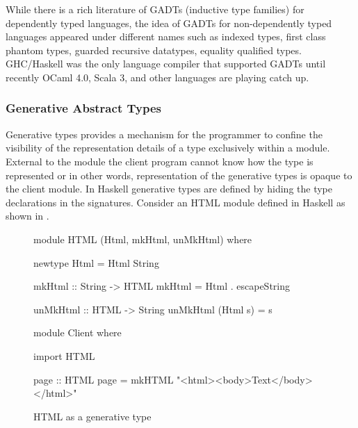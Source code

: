 \documentclass[manuscript,screen,nonacm]{acmart}
\begin{document}
While there is a rich literature of GADTs (inductive type families) for dependently typed languages\cite{dybjer_inductive_1991, dybjer_inductive_1994}, the idea of GADTs for non-dependently typed languages appeared under different names such as indexed types\cite{zenger_indexed_1997}, first class phantom types\cite{cheney_first-class_2003}, guarded recursive datatypes\cite{xi_guarded_2003}, equality qualified types\cite{sheard_meta-programming_2008}. GHC/Haskell was the only language compiler that supported GADTs\cite{peyton_jones_wobbly_2004} until recently OCaml 4.0\cite{garrigue_gadt_2011}, Scala 3\cite{TODO}, and other languages are playing catch up.

\subsubsection{Generative Abstract Types}\label{subsubsec:gen-abs-types}
Generative types provides a mechanism for the programmer to confine the visibility of the representation details of a type exclusively within a module. External to the module the client program cannot know how the type is represented or in other words, representation of the generative types is opaque to the client module. In Haskell generative types are defined by hiding the type declarations in the signatures. Consider an HTML module defined in Haskell as shown in .
\begin{figure}[ht]
 \centering
 \begin{minipage}[ht]{0.4\linewidth}
 \begin{code}
 module HTML (Html, mkHtml, unMkHtml)
 where

 newtype Html = Html String

 mkHtml :: String -> HTML
 mkHtml = Html . escapeString

 unMkHtml :: HTML -> String
 unMkHtml (Html s) = s
 \end{code}
 \end{minipage}%
 \begin{minipage}[ht]{0.4\linewidth}
 \begin{code}
 module Client
 where

 import HTML

 page :: HTML
 page = mkHTML "<html><body>Text</body></html>"

 \end{code}
 \end{minipage}
 \caption{HTML as a generative type}
 \label{fig:html-generative-type}
\end{figure}
\end{document}
